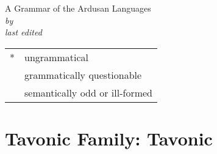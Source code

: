 \documentclass[12pt,letterpaper,openany,twoside]{memoir}
\title{\landn}
\author{Ian A.~Cook}
\date{\today}
\makeatletter
\let\originalpart=\part
\def\part{\cleardoublepage\originalpart}
\newcommand{\ungr}{*}
\newcommand{\ques}{\fakesuperscript{?}}
\newcommand{\excl}{\fakesuperscript{!}}
\newcommand{\landadj}{Ardusan}
\newcommand{\subtitle}{A Grammar of the \landadj{} Languages}
\newcommand{\Titlep}{%
	\begingroup
	\centering
	{\Huge \@title}\\[\baselineskip]
	{\Huge \scr{\@title}}\\[\baselineskip]
	{\LARGE\textsc \subtitle{}}\\[\baselineskip]
	{\Large\textit{by \@author}}\\
	\vfill
	\textit{last edited}\\
	{\large \@date}\par
	\endgroup
}
\makeatother
\begin{document}

\begin{titlingpage}
	\Titlep{}
	\clearpage
	
\end{titlingpage}


\frontmatter
{}\label{cha:toc}
\tableofcontents*
\clearpage
\listoffigures\label{cha:figures}
\clearpage
\listoftables\label{cha:tables}
\clearpage
\printglosses\label{cha:glossary}
\bigskip
\noindent\begin{tabular}{@{} l l}
\ungr & ungrammatical\\
\ques & grammatically questionable\\
\excl & semantically odd or ill-formed\\
\end{tabular}
\clearpage










\mainmatter

\part{Tavonic Family: Tavonic}










\end{document}
